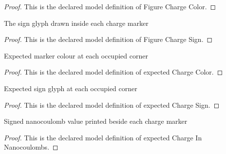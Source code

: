 \begin{proof}
  This is the declared model definition of Figure Charge Color.
\end{proof}
\begin{definition}
  \label{def:physics:phyx-mini-0896:phyxminiproblems-problemphyxmini0896-figurechargesign}
  The sign glyph drawn inside each charge marker
\end{definition}
\begin{proof}
  This is the declared model definition of Figure Charge Sign.
\end{proof}
\begin{definition}
  \label{def:physics:phyx-mini-0896:phyxminiproblems-problemphyxmini0896-expectedchargecolor}
  Expected marker colour at each occupied corner
\end{definition}
\begin{proof}
  This is the declared model definition of expected Charge Color.
\end{proof}
\begin{definition}
  \label{def:physics:phyx-mini-0896:phyxminiproblems-problemphyxmini0896-expectedchargesign}
  Expected sign glyph at each occupied corner
\end{definition}
\begin{proof}
  This is the declared model definition of expected Charge Sign.
\end{proof}
\begin{definition}
  \label{def:physics:phyx-mini-0896:phyxminiproblems-problemphyxmini0896-expectedchargeinnanocoulombs}
  Signed nanocoulomb value printed beside each charge marker
\end{definition}
\begin{proof}
  This is the declared model definition of expected Charge In Nanocoulombs.
\end{proof}
